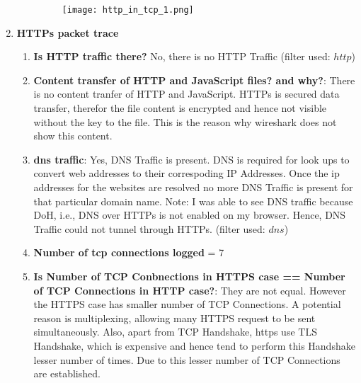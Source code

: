 \documentclass[12pt]{article}
\begin{document}
\begin{enumerate}
\begin{enumerate}
        \begin{figure}[h!]
            \centering
            \texttt{[image: http\_in\_tcp\_1.png]}
        \end{figure}
    \end{enumerate}
    \item \textbf{HTTPs packet trace}
    \begin{enumerate}
        \item \textbf{Is HTTP traffic there?} No, there is no HTTP Traffic (filter used: $http$)
        \item \textbf{Content transfer of HTTP and JavaScript files? and why?}: There is no content tranfer of HTTP and JavaScript. HTTPs is secured data transfer, therefor the file content is encrypted and hence not visible without the key to the file. This is the reason why wireshark does not show this content.
        \item \textbf{dns traffic}: Yes, DNS Traffic is present. DNS is required for look ups to convert web addresses to their correspoding IP Addresses. Once the ip addresses for the websites are resolved no more DNS Traffic is present for that particular domain name. Note: I was able to see DNS traffic because DoH, i.e., DNS over HTTPs is not enabled on my browser. Hence, DNS Traffic could not tunnel through HTTPs. (filter used: $dns$)
        \item \textbf{Number of tcp connections logged} = 7
        \item \textbf{Is Number of TCP Conbnections in HTTPS case == Number of TCP Connections in HTTP case?}: They are not equal. However the HTTPS case has smaller number of TCP Connections. A potential reason is multiplexing, allowing many HTTPS request to be sent simultaneously. Also, apart from TCP Handshake, https use TLS Handshake, which is expensive and hence tend to perform this Handshake lesser number of times. Due to this lesser number of TCP Connections are established.
    \end{enumerate}
\end{enumerate}
\end{document}
